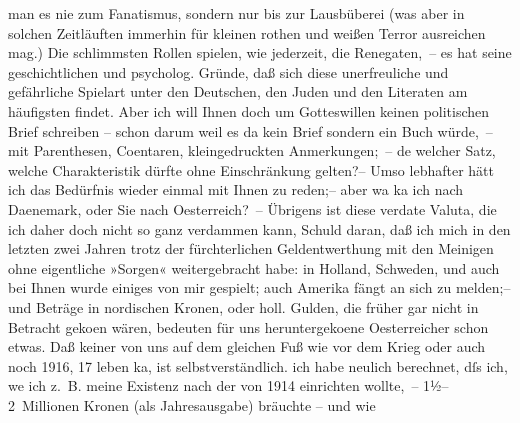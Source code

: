 \begin{ledgroupsized}[t]{13cm}
               man \strikeout{\textcolor{gray}{×}\-\textcolor{gray}{×}} es nie zum Fanatismus, sondern nur \introOben{}bis\introOben{} zur
               Lausbüberei (was aber in solchen Zeitläuften immerhin für kleinen rothen und weißen
               Terror ausreichen mag.) Die schlimmsten Rollen spielen, wie jederzeit, die
               Renegaten, – es hat seine geschichtlichen \introOben{}und psycholog.\introOben{}
               Gründe, daß sich diese \introOben{}unerfreuliche und gefährliche\introOben{}
               Spielart unter den Deutschen, den Juden und den Literaten am häufigsten findet.\pend
           \pstart
           {\pb}Aber ich will Ihnen doch um Gotteswillen keinen
               politischen Brief schreiben – schon darum weil es da{\geminationn}
               kein Brief sondern ein Buch würde, – mit Parenthesen, Co{\geminationm}entaren, kleingedruckten Anmerkungen; – de{\geminationn} welcher
               Satz, welche Charakteristik dürfte ohne Einschränkung gelten?– Umso lebhafter hätt
               ich das Bedürfnis wieder einmal mit Ihnen zu reden;– aber wa{\geminationn} ka{\geminationn} ich nach Daenemark, oder Sie nach Oesterreich? –\pend
           \pstart
           Übrigens ist  diese verda{\geminationm}te Valuta, die ich daher doch nicht so ganz verdammen
               kann, \introOben{}Schuld daran\introOben{}, daß ich mich in den letzten zwei Jahren
               trotz der fürchterlichen Geldentwerthung mit den Meinigen ohne eigentliche »Sorgen«
               weitergebracht habe: in Holland, Schweden, und auch bei Ihnen wurde einiges von
               mir gespielt; auch Amerika fängt an sich zu
               melden;– und  Beträge in nordischen Kronen, oder holl. Gulden, die früher gar nicht in Betracht geko{\geminationm}en {\pb}wären, bedeuten
               für uns heruntergeko{\geminationm}ene Oesterreicher schon etwas. Daß keiner von uns auf dem gleichen
               Fuß wie vor dem Krieg oder auch noch 1916, 17 leben ka{\geminationn}, ist selbstverständlich. ich habe neulich berechnet,
               dſs ich, we{\geminationn} ich z. B. meine Existenz nach  der von 1914 einrichten wollte, –
               1½–2 Millionen Kronen \introOben{}(als Jahresausgabe)\introOben{} bräuchte – und wie

\end{ledgroupsized}
